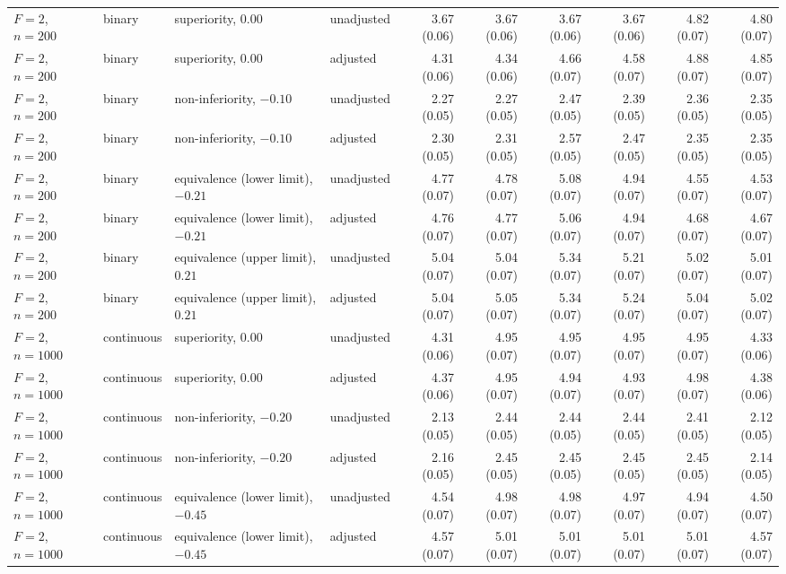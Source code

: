 \documentclass[12pt,a4paper]{article}
\theoremstyle{definition}
\theoremstyle{remark}\newtheorem{remark}{Remark}
\numberwithin{equation}{section}
\begin{document}
\begin{landscape}
\begin{singlespace}
\begin{longtable}{@{}llllrrrrrr@{}}
$F=2$, $n=200$ & binary & superiority, $0.00$ & unadjusted & 3.67 (0.06) & 3.67 (0.06) & 3.67 (0.06) & 3.67 (0.06) & 4.82 (0.07) & 4.80 (0.07)\\
$F=2$, $n=200$ & binary & superiority, $0.00$ & adjusted & 4.31 (0.06) & 4.34 (0.06) & 4.66 (0.07) & 4.58 (0.07) & 4.88 (0.07) & 4.85 (0.07)\\
$F=2$, $n=200$ & binary & non-inferiority, $-0.10$ & unadjusted & 2.27 (0.05) & 2.27 (0.05) & 2.47 (0.05) & 2.39 (0.05) & 2.36 (0.05) & 2.35 (0.05)\\
$F=2$, $n=200$ & binary & non-inferiority, $-0.10$ & adjusted & 2.30 (0.05) & 2.31 (0.05) & 2.57 (0.05) & 2.47 (0.05) & 2.35 (0.05) & 2.35 (0.05)\\
$F=2$, $n=200$ & binary & equivalence (lower limit), $-0.21$ & unadjusted & 4.77 (0.07) & 4.78 (0.07) & 5.08 (0.07) & 4.94 (0.07) & 4.55 (0.07) & 4.53 (0.07)\\
$F=2$, $n=200$ & binary & equivalence (lower limit), $-0.21$ & adjusted & 4.76 (0.07) & 4.77 (0.07) & 5.06 (0.07) & 4.94 (0.07) & 4.68 (0.07) & 4.67 (0.07)\\
$F=2$, $n=200$ & binary & equivalence (upper limit), $0.21$ & unadjusted & 5.04 (0.07) & 5.04 (0.07) & 5.34 (0.07) & 5.21 (0.07) & 5.02 (0.07) & 5.01 (0.07)\\
$F=2$, $n=200$ & binary & equivalence (upper limit), $0.21$ & adjusted & 5.04 (0.07) & 5.05 (0.07) & 5.34 (0.07) & 5.24 (0.07) & 5.04 (0.07) & 5.02 (0.07)\\
$F=2$, $n=1000$ & continuous & superiority, $0.00$ & unadjusted & 4.31 (0.06) & 4.95 (0.07) & 4.95 (0.07) & 4.95 (0.07) & 4.95 (0.07) & 4.33 (0.06)\\
$F=2$, $n=1000$ & continuous & superiority, $0.00$ & adjusted & 4.37 (0.06) & 4.95 (0.07) & 4.94 (0.07) & 4.93 (0.07) & 4.98 (0.07) & 4.38 (0.06)\\
$F=2$, $n=1000$ & continuous & non-inferiority, $-0.20$ & unadjusted & 2.13 (0.05) & 2.44 (0.05) & 2.44 (0.05) & 2.44 (0.05) & 2.41 (0.05) & 2.12 (0.05)\\
$F=2$, $n=1000$ & continuous & non-inferiority, $-0.20$ & adjusted & 2.16 (0.05) & 2.45 (0.05) & 2.45 (0.05) & 2.45 (0.05) & 2.45 (0.05) & 2.14 (0.05)\\
$F=2$, $n=1000$ & continuous & equivalence (lower limit), $-0.45$ & unadjusted & 4.54 (0.07) & 4.98 (0.07) & 4.98 (0.07) & 4.97 (0.07) & 4.94 (0.07) & 4.50 (0.07)\\
$F=2$, $n=1000$ & continuous & equivalence (lower limit), $-0.45$ & adjusted & 4.57 (0.07) & 5.01 (0.07) & 5.01 (0.07) & 5.01 (0.07) & 5.01 (0.07) & 4.57 (0.07)\\

\end{longtable}
\end{singlespace}
\end{landscape}
\end{document}
